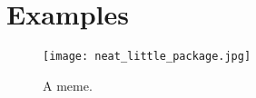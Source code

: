 \documentclass[float=false, crop=false, class=report, a4, 12pt, onesided]{standalone}
\begin{document}
\ifstandalone
	\appendix
\fi

\chapter{Examples}\label{ch:appendix1}

\begin{figure}[H]
\begin{center}
	\texttt{[image: neat\_little\_package.jpg]}
\end{center}
\caption{A meme.}
\end{figure}

\ifstandalone
	
\fi
\end{document}
